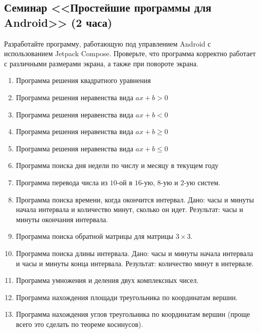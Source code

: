 \subsection{Семинар <<Простейшие программы для Android>> (2 часа)}

Разработайте программу, работающую под управлением Android с использованием Jetpack Compose. 
Проверьте, что программа корректно работает с различными размерами экрана,
а также при повороте экрана. 

\begin{enumerate}
 \item Программа решения квадратного уравнения
 \item Программа решения неравенства вида $ax+b>0$
    \item Программа решения неравенства вида $ax+b<0$
 \item Программа решения неравенства вида $ax+b\geqslant 0$
 \item Программа решения неравенства вида $ax+b\leqslant 0$
\item Программа поиска дня недели по числу и месяцу в текущем году
 \item  Программа перевода числа из $10$-ой в $16$-ую, $8$-ую и $2$-ую систем.
 \item  Программа поиска времени, когда окончится интервал. 
 Дано: часы и минуты начала интервала и количество минут, сколько он идет.
 Результат: часы и минуты окончания интервала.
  \item Программа поиска обратной матрицы для матрицы $3\times3$.
 \item
 Программа поиска длины интервала. 
 Дано: часы и минуты начала интервала и часы и минуты конца интервала.
 Результат: количество минут в интервале.
 \item
 Программа умножения и деления двух комплексных чисел.
 
 
 \item
 Программа нахождения площади треугольника по координатам вершин.
 
 \item
 Программа нахождения углов треугольника по координатам вершин (проще всего это сделать по теореме косинусов).


\end{enumerate}
